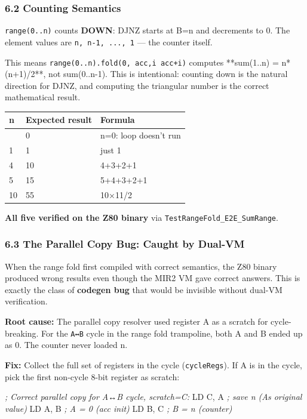 \documentclass[
  11pt,
]{article}
\newenvironment{Shaded}{}{}
\newcommand{\CommentTok}[1]{\textcolor[rgb]{0.38,0.63,0.69}{\textit{#1}}}
\newcommand{\NormalTok}[1]{#1}
\newcommand{\OperatorTok}[1]{\textcolor[rgb]{0.40,0.40,0.40}{#1}}
\begin{document}
\subsubsection{6.2 Counting Semantics}\label{counting-semantics}

\texttt{range(0..n)} counts \textbf{DOWN}: DJNZ starts at B=n and
decrements to 0. The element values are \texttt{n,\ n-1,\ ...,\ 1} ---
the counter itself.

This means
\texttt{range(0..n).fold(0,\ \textbar{}acc,i\textbar{}\ acc+i)} computes
**sum(1..n) = n*(n+1)/2**, not sum(0..n-1). This is intentional:
counting down is the natural direction for DJNZ, and computing the
triangular number is the correct mathematical result.

\begin{longtable}[]{@{}lll@{}}
\toprule\noalign{}
n & Expected result & Formula \\
\midrule\noalign{}
\endhead
\bottomrule\noalign{}
\endlastfoot
0 & 0 & n=0: loop doesn't run \\
1 & 1 & just 1 \\
4 & 10 & 4+3+2+1 \\
5 & 15 & 5+4+3+2+1 \\
10 & 55 & 10×11/2 \\
\end{longtable}

\textbf{All five verified on the Z80 binary} via
\texttt{TestRangeFold\_E2E\_SumRange}.

\subsubsection{6.3 The Parallel Copy Bug: Caught by
Dual-VM}\label{the-parallel-copy-bug-caught-by-dual-vm}

When the range fold first compiled with correct semantics, the Z80
binary produced wrong results even though the MIR2 VM gave correct
answers. This is exactly the class of \textbf{codegen bug} that would be
invisible without dual-VM verification.

\textbf{Root cause:} The parallel copy resolver used register A as a
scratch for cycle-breaking. For the \texttt{A↔B} cycle in the range fold
trampoline, both A and B ended up as 0. The counter never loaded n.

\textbf{Fix:} Collect the full set of registers in the cycle
(\texttt{cycleRegs}). If A is in the cycle, pick the first non-cycle
8-bit register as scratch:

\begin{Shaded}
\begin{Highlighting}[]
\CommentTok{; Correct parallel copy for A↔B cycle, scratch=C:}
\NormalTok{LD C}\OperatorTok{,}\NormalTok{ A     }\CommentTok{; save n (A\textquotesingle{}s original value)}
\NormalTok{LD A}\OperatorTok{,}\NormalTok{ B     }\CommentTok{; A = 0 (acc init)}
\NormalTok{LD B}\OperatorTok{,}\NormalTok{ C     }\CommentTok{; B = n (counter)}
\end{Highlighting}
\end{Shaded}
\end{document}
